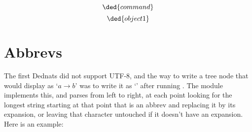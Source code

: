 \documentclass[oneside]{article}
\begin{document}
\pu
$$\ded{command}$$
$$\ded{object1}$$







%

\section{Abbrevs}

The first Dednats did not support UTF-8, and the way to write a tree
node that would display as `$a→b$' was to write it as `'
after running . The module
 implements this, and  parses
 from left to right, at each point looking for the longest
string starting at that point that is an abbrev and replacing it by
its expansion, or leaving that character untouched if it doesn't have
an expansion. Here is an example:

\end{document}
